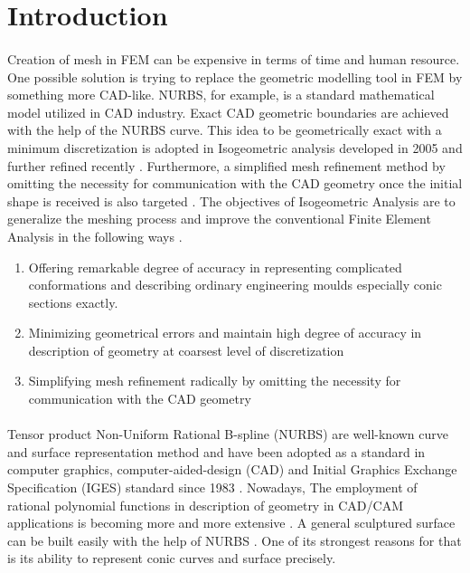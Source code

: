 \section{Introduction}
\paragraph{}
Creation of mesh in FEM can be expensive in terms of time and human resource.
One possible solution is trying to replace the geometric modelling tool in FEM by something more CAD-like.
NURBS, for example, is a standard mathematical model utilized in CAD industry.
Exact CAD geometric boundaries are achieved with the help of the NURBS curve.
This idea to be geometrically exact with a minimum discretization is adopted in Isogeometric analysis developed in 2005 \cite{Hug2005b} and further refined recently \cite{Zhang2007,Hug2005b,Cot2006,Cot2009,Baz2006a,Baz2006b}.
Furthermore, a simplified mesh refinement method by omitting the necessity for communication with the CAD geometry once the initial shape is received is also targeted \cite{Cot2007}.
The objectives of Isogeometric Analysis are to generalize the meshing process and improve the conventional Finite Element Analysis in the following ways \cite{Aur2010}.
\begin{enumerate}
    \item Offering remarkable degree of accuracy in representing complicated conformations and describing ordinary engineering moulds especially conic sections exactly.
    \item Minimizing geometrical errors and maintain high degree of accuracy in description of geometry at coarsest level of discretization
    \item Simplifying mesh refinement radically by omitting the necessity for communication with the CAD geometry
\end{enumerate}

\paragraph{}
Tensor product Non-Uniform Rational B-spline (NURBS) are well-known curve and surface representation method and have been adopted as a standard in computer graphics, computer-aided-design (CAD) \cite{Nas2003} and Initial Graphics Exchange Specification (IGES) standard since 1983 \cite{IGES1983}.
Nowadays, The employment of rational polynomial functions in description of geometry in CAD/CAM applications is becoming more and more extensive \cite{Pie1987}.
A general sculptured surface can be built easily with the help of NURBS \cite{Rog2001}.
One of its strongest reasons for that is its ability to represent conic curves and surface precisely.

